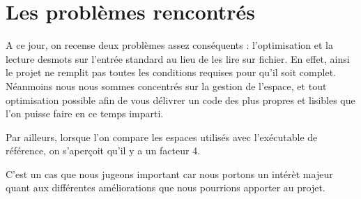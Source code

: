 \documentclass[12pt, letterpaper]{report}
\begin{document}
\section{Les problèmes rencontrés}

A ce jour, on recense deux problèmes assez conséquents : l'optimisation et la lecture desmots sur l'entrée standard
au lieu de les lire sur fichier.
En effet, ainsi le projet ne remplit pas toutes les conditions requises pour qu'il soit complet. 
Néanmoins nous nous sommes concentrés sur la gestion de l'espace, et tout optimisation possible
afin de vous délivrer un code des plus propres et lisibles que l'on puisse faire 
en ce temps imparti.


Par ailleurs, lorsque l'on compare les espaces utilisés avec l'exécutable de référence, 
on s'aperçoit qu'il y a un facteur 4. 

C'est un cas que nous jugeons important car nous portons un 
intérèt majeur quant aux différentes améliorations que nous pourrions
apporter au projet.
\end{document}
